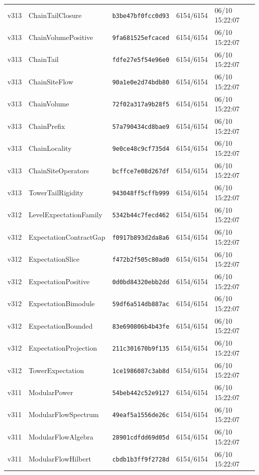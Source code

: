 \documentclass[11pt]{article}
\theoremstyle{definition}\newtheorem{deriv}{Derivação}
\begin{document}
{\begin{longtable}{@{}lllll@{}}
v313 & ChainTailClosure & \texttt{b3be47bf0fcc0d93} & 6154/6154 & 06/10 15:22:07 \\
v313 & ChainVolumePositive & \texttt{9fa681525efcaced} & 6154/6154 & 06/10 15:22:07 \\
v313 & ChainTail & \texttt{fdfe27e5f54e96e0} & 6154/6154 & 06/10 15:22:07 \\
v313 & ChainSiteFlow & \texttt{90a1e0e2d74bdb80} & 6154/6154 & 06/10 15:22:07 \\
v313 & ChainVolume & \texttt{72f02a317a9b28f5} & 6154/6154 & 06/10 15:22:07 \\
v313 & ChainPrefix & \texttt{57a790434cd8bae9} & 6154/6154 & 06/10 15:22:07 \\
v313 & ChainLocality & \texttt{9e0ce48c9cf735d4} & 6154/6154 & 06/10 15:22:07 \\
v313 & ChainSiteOperators & \texttt{bcffce7e08d267df} & 6154/6154 & 06/10 15:22:07 \\
v313 & TowerTailRigidity & \texttt{943048ff5cffb999} & 6154/6154 & 06/10 15:22:07 \\
v312 & LevelExpectationFamily & \texttt{5342b44c7fecd462} & 6154/6154 & 06/10 15:22:07 \\
v312 & ExpectationContractGap & \texttt{f0917b893d2da8a6} & 6154/6154 & 06/10 15:22:07 \\
v312 & ExpectationSlice & \texttt{f472b2f505c80ad0} & 6154/6154 & 06/10 15:22:07 \\
v312 & ExpectationPositive & \texttt{0d0bd84320ebb2dd} & 6154/6154 & 06/10 15:22:07 \\
v312 & ExpectationBimodule & \texttt{59df6a514db887ac} & 6154/6154 & 06/10 15:22:07 \\
v312 & ExpectationBounded & \texttt{83e690806b4b43fe} & 6154/6154 & 06/10 15:22:07 \\
v312 & ExpectationProjection & \texttt{211c301670b9f135} & 6154/6154 & 06/10 15:22:07 \\
v312 & TowerExpectation & \texttt{1ce1986087c3ab8d} & 6154/6154 & 06/10 15:22:07 \\
v311 & ModularPower & \texttt{54beb442c52e9127} & 6154/6154 & 06/10 15:22:07 \\
v311 & ModularFlowSpectrum & \texttt{49eaf5a1556de26c} & 6154/6154 & 06/10 15:22:07 \\
v311 & ModularFlowAlgebra & \texttt{28901cdfdd69d05d} & 6154/6154 & 06/10 15:22:07 \\
v311 & ModularFlowHilbert & \texttt{cbdb1b3ff9f2728d} & 6154/6154 & 06/10 15:22:07 \\

\end{longtable}}
\end{document}
